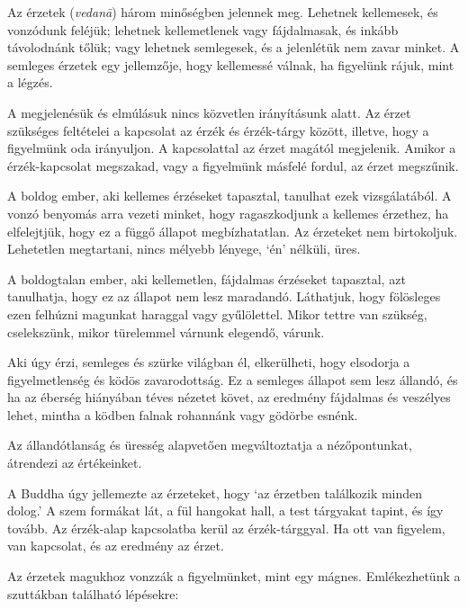 \clearpage

\vspace*{-\baselineskip}


Az érzetek (\emph{vedanā}) három minőségben jelennek meg. Lehetnek
kellemesek, és vonzódunk feléjük; lehetnek kellemetlenek vagy
fájdalmasak, és inkább távolodnánk tőlük; vagy lehetnek semlegesek, és a
jelenlétük nem zavar minket. A semleges érzetek egy jellemzője, hogy
kellemessé válnak, ha figyelünk rájuk, mint a légzés.

A megjelenésük és elmúlásuk nincs közvetlen irányításunk alatt. Az érzet
szükséges feltételei a kapcsolat az érzék és érzék-tárgy között,
illetve, hogy a figyelmünk oda irányuljon. A kapcsolattal az érzet
magától megjelenik. Amikor a érzék-kapcsolat megszakad, vagy a
figyelmünk másfelé fordul, az érzet megszűnik.

A boldog ember, aki kellemes érzéseket tapasztal, tanulhat ezek
vizsgálatából. A vonzó benyomás arra vezeti minket, hogy ragaszkodjunk a
kellemes érzethez, ha elfelejtjük, hogy ez a függő állapot
megbízhatatlan. Az érzeteket nem birtokoljuk. Lehetetlen megtartani,
nincs mélyebb lényege, `én' nélküli, üres.

\enlargethispage*{\baselineskip}

A boldogtalan ember, aki kellemetlen, fájdalmas érzéseket tapasztal, azt
tanulhatja, hogy ez az állapot nem lesz maradandó. Láthatjuk, hogy
fölösleges ezen felhúzni magunkat haraggal vagy gyűlölettel. Mikor
tettre van szükség, cselekszünk, mikor türelemmel várnunk elegendő,
várunk.

Aki úgy érzi, semleges és szürke világban él, elkerülheti, hogy
elsodorja a figyelmetlenség és ködös zavarodottság. Ez a semleges
állapot sem lesz állandó, és ha az éberség hiányában téves nézetet
követ, az eredmény fájdalmas és veszélyes lehet, mintha a ködben falnak
rohannánk vagy gödörbe esnénk.

\clearpage

Az állandótlanság és üresség alapvetően megváltoztatja a nézőpontunkat,
átrendezi az értékeinket.

A Buddha úgy jellemezte az érzeteket, hogy `az érzetben találkozik
minden dolog.' A szem formákat lát, a fül hangokat hall, a test
tárgyakat tapint, és így tovább. Az érzék-alap kapcsolatba kerül az
érzék-tárggyal. Ha ott van figyelem, van kapcsolat, és az eredmény az
érzet.

Az érzetek magukhoz vonzzák a figyelmünket, mint egy mágnes.
Emlékezhetünk a szuttákban található lépésekre:

